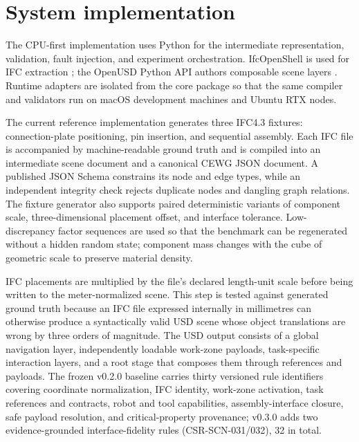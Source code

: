 \section{System implementation}
\label{sec:implementation}

The CPU-first implementation uses Python for the intermediate representation,
validation, fault injection, and experiment orchestration. IfcOpenShell is used
for IFC extraction \cite{ifcopenshellDocs}; the OpenUSD Python API authors
composable scene layers \cite{openUSD}. Runtime adapters are isolated from the
core package so that the same compiler and validators run on macOS development
machines and Ubuntu RTX nodes.

The current reference implementation generates three IFC4.3 fixtures:
connection-plate positioning, pin insertion, and sequential assembly. Each IFC
file is accompanied by machine-readable ground truth and is compiled into an
intermediate scene document and a canonical CEWG JSON document. A published
JSON Schema constrains its node and edge types, while an independent integrity
check rejects duplicate nodes and dangling graph relations. The fixture
generator also supports paired deterministic variants of component scale,
three-dimensional placement offset, and interface tolerance. Low-discrepancy
factor sequences are used so that the benchmark can be regenerated without a
hidden random state; component mass changes with the cube of geometric scale
to preserve material density.

IFC placements are multiplied by the file's declared length-unit scale before
being written to the meter-normalized scene. This step is tested against
generated ground truth because an IFC file expressed internally in
millimetres can otherwise produce a syntactically valid USD scene whose object
translations are wrong by three orders of magnitude. The USD output consists
of a global navigation layer, independently loadable work-zone payloads,
task-specific interaction layers, and a root stage that composes them through
references and payloads.
The frozen v0.2.0 baseline carries thirty versioned rule identifiers covering
coordinate normalization,
IFC identity, work-zone activation, task references and contracts, robot
and tool capabilities, assembly-interface closure, safe payload resolution,
and critical-property provenance; v0.3.0 adds two evidence-grounded
interface-fidelity rules (CSR-SCN-031/032), 32 in total.

